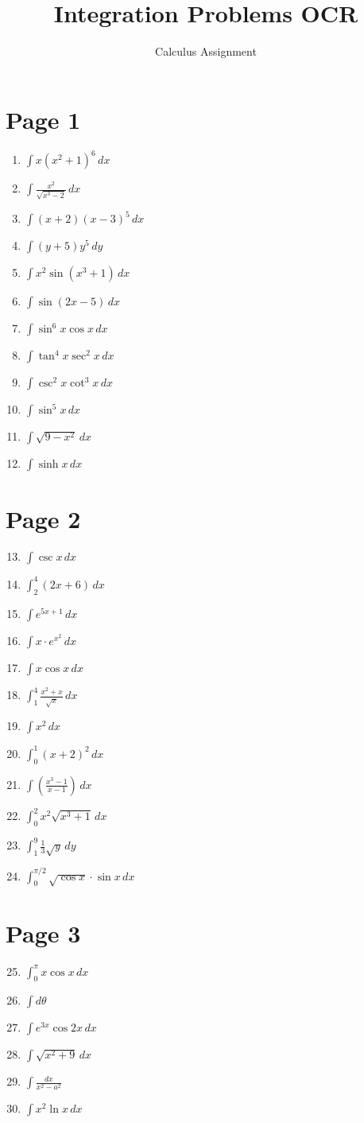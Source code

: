 \documentclass[12pt,a4paper]{article}
\begin{document}
\title{Integration Problems OCR}
\author{Calculus Assignment}
\date{}
\maketitle

\section*{Page 1}
\begin{enumerate}
    \item $\int x(x^2+1)^6 \, dx$
    \item $\int \frac{x^2}{\sqrt{x^3-2}} \, dx$
    \item $\int (x+2)(x-3)^5 \, dx$
    \item $\int (y+5)y^5 \, dy$
    \item $\int x^2 \sin(x^3+1) \, dx$
    \item $\int \sin(2x-5) \, dx$
    \item $\int \sin^6 x \cos x \, dx$
    \item $\int \tan^4 x \sec^2 x \, dx$
    \item $\int \csc^2 x \cot^3 x \, dx$
    \item $\int \sin^5 x \, dx$
    \item $\int \sqrt{9-x^2} \, dx$
    \item $\int \sinh x \, dx$
\end{enumerate}

\section*{Page 2}
\begin{enumerate}
    \setcounter{enumi}{12}
    \item $\int \csc x \, dx$
    \item $\int_{2}^{4} (2x+6) \, dx$
    \item $\int e^{5x+1} \, dx$
    \item $\int x \cdot e^{x^2} \, dx$
    \item $\int x \cos x \, dx$
    \item $\int_{1}^{4} \frac{x^2+x}{\sqrt{x}} \, dx$
    \item $\int x^2 \, dx$
    \item $\int_{0}^{1} (x+2)^2 \, dx$
    \item $\int \left(\frac{x^3-1}{x-1}\right) \, dx$
    \item $\int_{0}^{2} x^2 \sqrt{x^3+1} \, dx$
    \item $\int_{1}^{9} \frac{1}{3} \sqrt{y} \, dy$
    \item $\int_{0}^{\pi/2} \sqrt{\cos x} \cdot \sin x \, dx$
\end{enumerate}

\section*{Page 3}
\begin{enumerate}
    \setcounter{enumi}{24}
    \item $\int_{0}^{\pi} x \cos x \, dx$
    \item $\int d\theta$
    \item $\int e^{3x} \cos 2x \, dx$
    \item $\int \sqrt{x^2+9} \, dx$
    \item $\int \frac{dx}{x^2-a^2}$
    \item $\int x^2 \ln x \, dx$
\end{enumerate}
\end{document}

